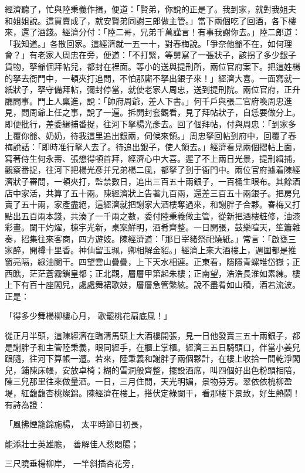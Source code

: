 \begin{showcontents}{}
經濟聽了，忙與陸秉義作揖，便道：「賢弟，你說的正是了。我到家，就對我姐夫和姐姐說。這買賣成了，就安賢弟同謝三郎做主管。」當下兩個吃了回酒，各下樓來，還了酒錢。經濟分付：「陸二哥，兄弟千萬謹言！有事我謝你去。」陸二郎道：「我知道。」各散回家。這經濟就一五一十，對春梅說。「爭奈他爺不在，如何理會？」有老家人周忠在旁，便道：「不打緊，等舅寫了一張狀子，該拐了多少銀子貨物，拏爺個拜帖兒，都封在裡面。等小的送與提刑所，兩位官府案下。把這姓楊的拏去衙門中，一頓夾打追問，不怕那廝不拏出銀子來！」經濟大喜。一面寫就一紙狀子，拏守備拜帖，彌封停當，就使老家人周忠，送到提刑院。兩位官府，正升廳問事。門上人稟進，說：「帥府周爺，差人下書。」何千戶與張二官府喚周忠進見，問周爺上任之事，說了一遍。拆開封套觀看，見了拜帖狀子，自恁要做分上。即便批行，差委緝捕番捉，往河下拏楊光彥去。回了個拜帖，付與周忠：「到家多上覆你爺、奶奶，待我這里追出銀兩，伺候來領。」周忠拏回帖到府中，回覆了春梅說話：「即時准行拏人去了。待追出銀子，使人領去。」經濟看見兩個摺帖上面，寫著侍生何永壽、張懋得頓首拜，經濟心中大喜。遲了不上兩日光景，提刑緝捕，觀察番捉，往河下把楊光彥并兄弟楊二風，都拏了到于衙門中。兩位官府據着陳經濟狀子審問，一頓夾打，監禁數日，追出三百五十兩銀子，一百桶生眼布。其餘酒店中家活，共算了五十兩。陳經濟狀上告著九百兩，還差三百五十兩銀子。把房兒賣了五十兩，家產盡絕，這經濟就把謝家大酒樓奪過來，和謝胖子合夥。春梅又打點出五百兩本錢，共湊了一千兩之數，委付陸秉義做主管，從新把酒樓粧修，油漆彩畫。闌干灼燿，棟宇光新，桌案鮮明，酒肴齊整。一日開張，鼓樂喧天，笙簫雜奏，招集往來客商，四方遊妓。陳經濟道：「那日宰豬祭祀燒紙。」常言：「啟甕三家醉，開樽十里香。神仙留玉珮，卿相解金貂。」經濟上來大酒樓上，週圍都是推窗亮隔，綠油闌干。四望雲山疊疊，上下天水相連。正東看，隱隱青螺堆岱嶽；正西瞧，茫茫蒼霧鎖皇都；正北觀，層層甲第起朱樓；正南望，浩浩長淮如素練。樓上下有百十座閣兒，處處舞裙歌妓，層層急管繁絃。說不盡肴如山積，酒若流波。正是：

「得多少舞楊柳樓心月，  歌罷桃花扇底風！」

從正月半頭，這陳經濟在臨清馬頭上大酒樓開張，見一日他發賣三五十兩銀子，都是謝胖子和主管陸秉義，眼同經手，在櫃上掌櫃。經濟三五日騎頭口，伴當小姜兒跟隨，往河下算帳一遭。若來，陸秉義和謝胖子兩個夥計，在樓上收拾一間乾淨閣兒，鋪陳床帳，安放卓椅；糊的雪洞般齊整，擺設酒席，叫四個好出色粉頭相陪，陳三兒那里往來做量酒。一日，三月住間，天光明媚，景物芬芳。翠依依槐柳盈堤，紅馥馥杏桃燦錦。陳經濟在樓上，搭伏定綠闌干，看那樓下景致，好生熱鬧！有詩為證：

「風拂煙籠錦施楊，  太平時節日初長，

能添壯士英雄膽，  善解佳人愁悶腸；

三尺曉垂楊柳岸，  一竿斜插杏花旁，


\end{showcontents}
